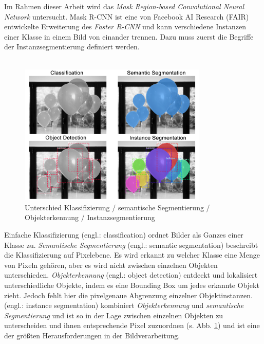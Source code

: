 Im Rahmen dieser Arbeit wird das \textit{Mask Region-based Convolutional Neural Network} untersucht. Mask R-CNN ist eine von Facebook AI Research (FAIR) entwickelte Erweiterung des \textit{Faster R-CNN} und kann verschiedene Instanzen einer Klasse in einem Bild von einander trennen. Dazu muss zuerst die Begriffe der Instanzsegmentierung definiert werden.
\\\\
\begin{figure}[ht]
  \centering
  \includegraphics[width=0.8\textwidth]{pics/instance-segmentation.png}
  \caption[Instanzsegmentierung]{Unterschied Klassifizierung / semantische Segmentierung / Objekterkennung / Instanzsegmentierung\cite{ref:matterport:maskrcnn}}
  \label{fig:instance-segmentation}
\end{figure}
\noindent
Einfache Klassifizierung (engl.: classification) ordnet Bilder als Ganzes einer Klasse zu. \textit{Semantische Segmentierung} (engl.: semantic segmentation) beschreibt die Klassifizierung auf Pixelebene. Es wird erkannt zu welcher Klasse eine Menge von Pixeln gehören, aber es wird nicht zwischen einzelnen Objekten unterschieden. \textit{Objekterkennung} (engl.: object detection) entdeckt und lokalisiert unterschiedliche Objekte, indem es eine Bounding Box um jedes erkannte Objekt zieht. Jedoch fehlt hier die pixelgenaue Abgrenzung einzelner Objektinstanzen.  (engl.: instance segmentation) kombiniert \textit{Objekterkennung} und \textit{semantische Segmentierung} und ist so in der Lage zwischen einzelnen Objekten zu unterscheiden und ihnen entsprechende Pixel zuzuordnen (s. Abb. \ref{fig:instance-segmentation}) und ist eine der größten Herausforderungen in der Bildverarbeitung.\cite{ref:maskrcnn}
\\\\
